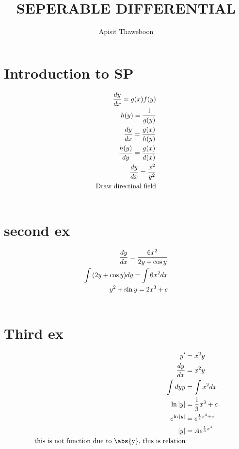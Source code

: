 \documentclass{article}
\author{Apisit Thaweboon \: 65050988}
\date{}
\title {\textbf{
        SEPERABLE DIFFERENTIAL
    }
}
\begin{document}
\section*{Introduction to SP}
\begin{align}
\begin{split}
    \frac{dy}{dx} = g(x)f(y) \\
    h(y) = \frac{1}{g(y)} \\
    \frac{dy}{dx} = \frac{g(x)}{h(y)} \\
    \frac{h(y)}{dy} = \frac{g(x)}{d(x)} \\
    \frac{dy}{dx} = \frac{x^2}{y^2} \\
    \text{Draw directinal field} \\
\notag
\end{split}
\end{align}


\section*{second ex}
\begin{align}
\begin{split}
    \frac{dy}{dx} = \frac{6x^2}{2y + \cos{y}} \\
    \int{(2y + \cos{y}) }dy = \int{6x^2}dx \\
    y^2 + \sin{y} = 2x^3 + c \\
\notag
\end{split}
\end{align}


\section*{Third ex}
\begin{align}
\begin{split}
    y' &= x^2y \\
    \frac{dy}{dx} &= x^2y \\
    \int{dy}{y} &= \int{x^2}dx \\
    \ln{|y|} &= \frac{1}{3}x^3 + c \\
    e^{\ln{|y|}} &= e^{\frac{1}{3}x^3 + c} \\
    |y| &= Ae^{\frac{1}{3}x^3} \\
    \text{this is not function due to \abs{y}, this is relation} \\
\nonumber
\end{split}
\end{align}
\end{document}
